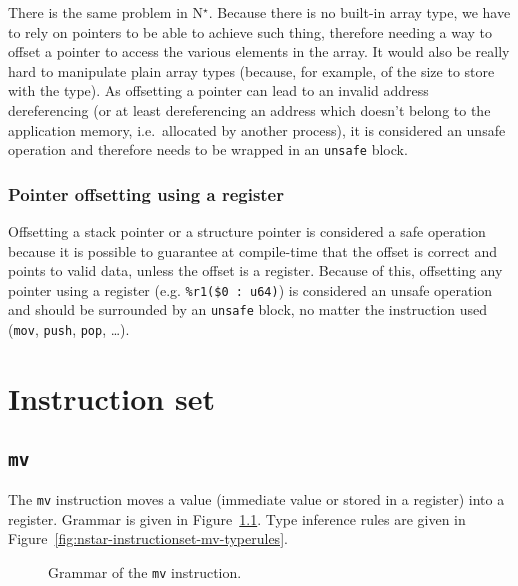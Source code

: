 There is the same problem in N$^\star$.
Because there is no built-in array type, we have to rely on pointers to be able to achieve such thing, therefore needing a way to offset a pointer to access the various elements in the array.
It would also be really hard to manipulate plain array types (because, for example, of the size to store with the type).
As offsetting a pointer can lead to an invalid address dereferencing (or at least dereferencing an address which doesn't belong to the application memory, i.e.\ allocated by another process), it is considered an unsafe operation and therefore needs to be wrapped in an \texttt{unsafe} block.

\subsection{Pointer offsetting using a register}\label{subsec:nstar-common-unsafe-ptroffsetreg}

Offsetting a stack pointer or a structure pointer is considered a safe operation because it is possible to guarantee at compile-time that the offset is correct and points to valid data, unless the offset is a register.
Because of this, offsetting any pointer using a register (e.g. \texttt{\%r1(\$0 : u64)}) is considered an unsafe operation and should be surrounded by an \texttt{unsafe} block, no matter the instruction used (\texttt{mov}, \texttt{push}, \texttt{pop}, \ldots).

\chapter{Instruction set}\label{chap:nstar-instructionset}

\section{\texttt{mv}}\label{sec:nstar-instructionset-mv}

The \texttt{mv} instruction moves a value (immediate value or stored in a register) into a register.
Grammar is given in Figure~\ref{fig:nstar-instructionset-mv-grammar}.
Type inference rules are given in Figure~\ref{fig:nstar-instructionset-mv-typerules}.

\begin{figure}[H]
  \centering
  \caption{Grammar of the \texttt{mv} instruction.}
  \label{fig:nstar-instructionset-mv-grammar}
\end{figure}

